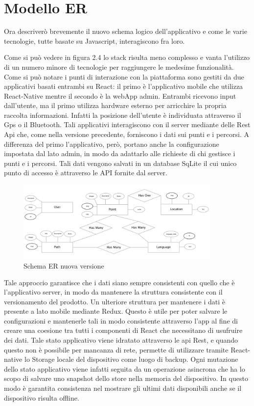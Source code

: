 \section{Modello ER}\vspace{5mm}

Ora descriverò brevemente il nuovo schema logico dell'applicativo e come le varie tecnologie, tutte basate su Javascript, interagiscono fra loro.

\vspace{5mm}Come si può vedere in figura 2.4 lo stack risulta meno complesso e vanta l'utilizzo di un numero minore di tecnologie per raggiungere le medesime funzionalità. Come si può notare i punti di interazione con la piattaforma sono gestiti da due applicativi basati entrambi su React: il primo è l'applicativo mobile che utilizza React-Native mentre il secondo è la webApp admin. Entrambi ricevono input dall'utente, ma il primo utilizza hardware esterno per arricchire la propria raccolta informazioni. Infatti la posizione dell'utente è individuata attraverso il Gps o il Bluetooth. Tali applicativi interagiscono con il server mediante delle Rest Api che, come nella versione precedente, forniscono i dati sui punti e i percorsi. A differenza del primo l'applicativo, però, portano anche la configurazione impostata dal lato admin, in modo da adattarlo alle richieste di chi gestisce i punti e i percorsi. Tali dati vengono salvati in un database SqLite il cui unico punto di accesso è attraverso le API fornite dal server.

\begin{figure}[h]
\centering
\includegraphics[width=0.9\textwidth]{images/erNew.png}
\caption{Schema ER nuova versione}
\end{figure}

Tale approccio garantisce che i dati siano sempre consistenti con quello che è l'applicativo server, in modo da mantenere la struttura consistente con il versionamento del prodotto. Un ulteriore struttura per mantenere i dati è presente a lato mobile mediante Redux. Questo è utile per poter salvare le configurazioni e mantenerle tali in modo consistente attraverso l'app al fine di creare una coesione tra tutti i componenti di React che necessitano di usufruire dei dati. Tale stato applicativo viene idratato attraverso le api Rest, e quando questo non è possibile per mancanza di rete, permette di utilizzare tramite React-native lo Storage locale del dispositivo come luogo di backup. Ogni mutazione dello stato applicativo viene infatti seguita da un operazione asincrona che ha lo scopo di salvare uno snapshot dello store nella memoria del dispositivo. In questo modo è garantita consistenza nel mostrare gli ultimi dati disponibili anche se il dispositivo risulta offline.\vspace{5mm}

